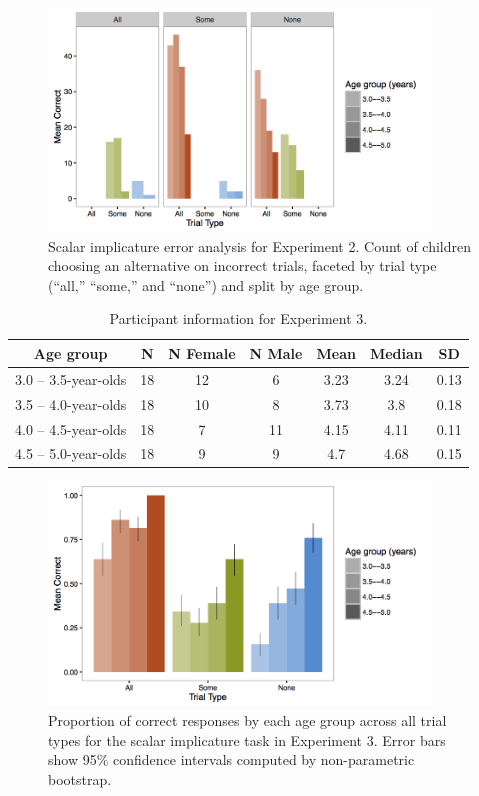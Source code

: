 \documentclass[man]{apa2}
\begin{document}
\begin{figure}
 \begin{center}
  \includegraphics[width=4in]{figures/exp2_wrong.png}
  \caption{\label{fig:exp2_wrong} Scalar implicature error analysis for Experiment 2. Count of children choosing an alternative on incorrect trials, faceted by trial type (``all,'' ``some,'' and ``none'') and split by age group.}
 \end{center}
\end{figure}

\begin{table}
\centering
\begin{tabular}{ccccccc}
\hline
{\bf Age group} & {\bf N} & {\bf N Female} & {\bf N Male} & {\bf Mean} &  {\bf Median} & {\bf SD} \\
\hline
3.0 -- 3.5-year-olds & 18 & 12 & 6 & 3.23 & 3.24 & 0.13\\
3.5 -- 4.0-year-olds & 18 & 10 & 8 & 3.73 & 3.8 & 0.18\\
4.0 -- 4.5-year-olds & 18 & 7 & 11 & 4.15 & 4.11 & 0.11\\
4.5 -- 5.0-year-olds & 18 & 9 & 9 & 4.7 & 4.68 & 0.15\\
\hline
\end{tabular}
\caption{\label{tab:exp_3_demo} Participant information for Experiment 3.}
\end{table}

\begin{figure}
 \begin{center}
  \includegraphics[width=4in]{figures/exp3_SIperformance.png}
  \caption{\label{fig:exp3_perf} Proportion of correct responses by each age group across all trial types for the scalar implicature task in Experiment 3. Error bars show 95\% confidence intervals computed by non-parametric bootstrap.}
 \end{center}
\end{figure}
\end{document}
